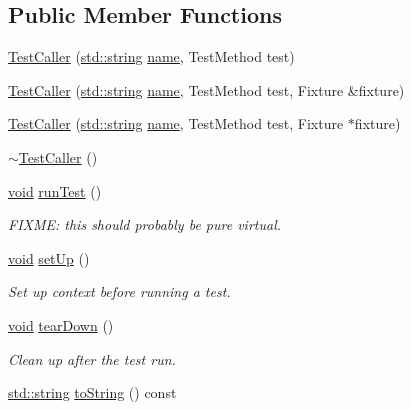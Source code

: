 \subsection*{Public Member Functions}
\begin{DoxyCompactItemize}
\item 
\hyperlink{class_test_caller_a84cb35144455c4245c45d755b84c6093}{Test\-Caller} (\hyperlink{glew_8h_ae84541b4f3d8e1ea24ec0f466a8c568b}{std\-::string} \hyperlink{fmod__codec_8h_a5c4947d4516dd7cfa3505ce3a648a4ef}{name}, Test\-Method test)
\item 
\hyperlink{class_test_caller_a21479de59b7c38a6d8bed9e66025ebb0}{Test\-Caller} (\hyperlink{glew_8h_ae84541b4f3d8e1ea24ec0f466a8c568b}{std\-::string} \hyperlink{fmod__codec_8h_a5c4947d4516dd7cfa3505ce3a648a4ef}{name}, Test\-Method test, Fixture \&fixture)
\item 
\hyperlink{class_test_caller_a5977f4de9736929451f30b039a42487d}{Test\-Caller} (\hyperlink{glew_8h_ae84541b4f3d8e1ea24ec0f466a8c568b}{std\-::string} \hyperlink{fmod__codec_8h_a5c4947d4516dd7cfa3505ce3a648a4ef}{name}, Test\-Method test, Fixture $\ast$fixture)
\item 
\hyperlink{class_test_caller_a7d8e2103e62a924d784b7a812681424a}{$\sim$\-Test\-Caller} ()
\item 
\hyperlink{wglew_8h_aeea6e3dfae3acf232096f57d2d57f084}{void} \hyperlink{class_test_caller_aad0c877a47b75d056a4f8f323d3169ab}{run\-Test} ()
\begin{DoxyCompactList}\small\item\em F\-I\-X\-M\-E\-: this should probably be pure virtual. \end{DoxyCompactList}\item 
\hyperlink{wglew_8h_aeea6e3dfae3acf232096f57d2d57f084}{void} \hyperlink{class_test_caller_ae6880afc711d24ae0b8846759064ceea}{set\-Up} ()
\begin{DoxyCompactList}\small\item\em Set up context before running a test. \end{DoxyCompactList}\item 
\hyperlink{wglew_8h_aeea6e3dfae3acf232096f57d2d57f084}{void} \hyperlink{class_test_caller_a0e463b88bf0ceacbd8875e0450ed2649}{tear\-Down} ()
\begin{DoxyCompactList}\small\item\em Clean up after the test run. \end{DoxyCompactList}\item 
\hyperlink{glew_8h_ae84541b4f3d8e1ea24ec0f466a8c568b}{std\-::string} \hyperlink{class_test_caller_a55f4f93fc657acb8c1dd500923a4bd1f}{to\-String} () const 
\end{DoxyCompactItemize}
